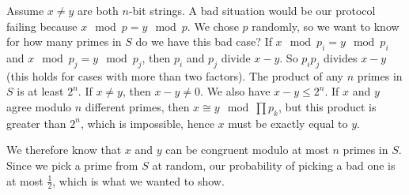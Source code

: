 Assume $x\neq y$ are both $n$-bit strings.  A bad situation would be our protocol failing because $x\mod p = y\mod p$.  We chose $p$ randomly, so we want to know for how many primes in $S$ do we have this bad case?  If $x\mod p_i = y\mod p_i$ and $x\mod p_j = y\mod p_j$, then $p_i$  and $p_j$ divide $x-y$.  So $p_ip_j$ divides $x-y$ (this holds for cases with more than two factors).  The product of any $n$ primes in $S$ is at least $2^n$.  If $x\neq y$, then $x-y\neq 0$.  We also have $x-y \leq 2^n$.  If $x$ and $y$ agree modulo $n$ different primes, then $x\cong y \mod \prod p_k$, but this product is greater than $2^n$, which is impossible, hence $x$ must be exactly equal to $y$.

We therefore know that $x$ and $y$ can be congruent modulo at most $n$ primes in $S$.  Since we pick a prime from $S$ at random, our probability of picking a bad one is at most $\frac{1}{2}$, which is what we wanted to show.

